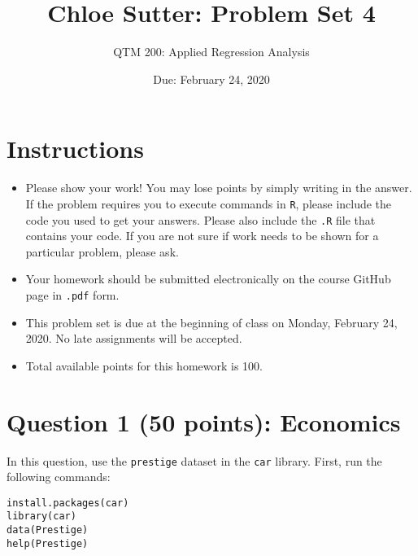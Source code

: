 \documentclass[12pt,letterpaper]{article}
\title{Chloe Sutter: Problem Set 4}
\date{Due: February 24, 2020}
\author{QTM 200: Applied Regression Analysis}
\begin{document}
	\maketitle
	
	\section*{Instructions}
	\begin{itemize}
		\item Please show your work! You may lose points by simply writing in the answer. If the problem requires you to execute commands in \texttt{R}, please include the code you used to get your answers. Please also include the \texttt{.R} file that contains your code. If you are not sure if work needs to be shown for a particular problem, please ask.
		\item Your homework should be submitted electronically on the course GitHub page in \texttt{.pdf} form.
		\item This problem set is due at the beginning of class on Monday, February 24, 2020. No late assignments will be accepted.
		\item Total available points for this homework is 100.
	\end{itemize}

	\vspace{1cm}
\section*{Question 1 (50 points): Economics}
\vspace{.25cm}
\noindent 	
In this question, use the \texttt{prestige} dataset in the \texttt{car} library. First, run the following commands:

\begin{verbatim}
install.packages(car)
library(car)
data(Prestige)
help(Prestige)
\end{verbatim} 

  
\end{document}
